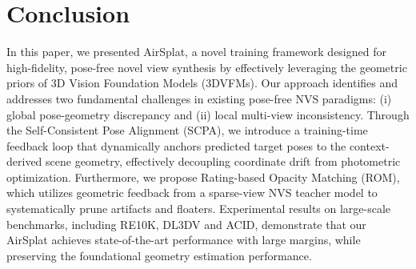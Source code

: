 \section{Conclusion}
\label{sec:conclusion}
In this paper, we presented AirSplat, a novel training framework designed for high-fidelity, pose-free novel view synthesis by effectively leveraging the geometric priors of 3D Vision Foundation Models (3DVFMs). 
Our approach identifies and addresses two fundamental challenges in existing pose-free NVS paradigms: (i) global pose-geometry discrepancy and (ii) local multi-view inconsistency.
Through the Self-Consistent Pose Alignment (SCPA), we introduce a training-time feedback loop that dynamically anchors predicted target poses to the context-derived scene geometry, effectively decoupling coordinate drift from photometric optimization.
Furthermore, we propose Rating-based Opacity Matching (ROM), which utilizes geometric feedback from a sparse-view NVS teacher model to systematically prune artifacts and floaters.
Experimental results on large-scale benchmarks, including RE10K, DL3DV and ACID, demonstrate that our AirSplat achieves state-of-the-art performance with large margins, while preserving the foundational geometry estimation performance.